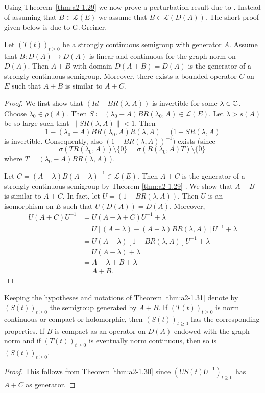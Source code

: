 Using Theorem~\ref{thm:a2-1.29}   we now prove a perturbation result due to \citet{deschschappacher:1984}.
Instead of assuming that $B \in \mathcal{L}(E)$ we assume that $B \in \mathcal{L}(D(A))$.
The short proof given below is due to G.\,Greiner.
\begin{theorem}\label{thm:a2-1.31}
Let $(T(t))_{t \geq 0}$ be a strongly continuous semigroup with generator $A$.
Assume that $B \colon D(A) \to D(A)$ is linear and continuous for the graph norm on $D(A)$.
Then $A + B$ with domain $D(A + B) = D(A)$ is the generator of a strongly continuous semigroup.
Moreover, there exists a bounded operator $C$ on $E$ such that $A + B$ is similar to $A + C$.
\end{theorem}
\begin{proof}
We first show that $(Id - BR(\lambda,A))$ is invertible for some $\lambda \in \mathbb{C}$.
Choose $\lambda_{0} \in \rho(A)$.
Then $S \coloneqq (\lambda_{0}-A)BR(\lambda_{0},A) \in \mathcal{L}(E)$.
Let $\lambda > s(A)$ be so large such that $\|SR(\lambda,A)\| < 1$.
Then 
\[
1 - (\lambda_{0} - A)BR(\lambda_{0},A)R(\lambda,A) = (1 - SR(\lambda,A)
\]
is invertible.
Consequently, also $(1 -BR(\lambda,A))^{-1})$ exists
(since 
\[
\sigma(TR(\lambda_{0},A)) \setminus \{0\} 
= \sigma(R(\lambda_{0},A)T) \setminus \{0\}\,
\]
where  $T = (\lambda_{0}-A)BR(\lambda,A)\, $).

Let $C = (A-\lambda)B(A-\lambda)^{-1} \in \mathcal{L}(E)$.
Then $A + C$ is the generator of a strongly continuous semigroup by Theorem \ref{thm:a2-1.29} . 
We show that $A + B$ is similar to $A + C$.
In fact, let $U = (1 - BR(\lambda,A))$.
Then $U$ is an isomorphism on $E$ such that $U(D(A)) = D(A)$. Moreover,
\begin{align*}		
U(A+C)U^{-1} &= U(A - \lambda+C)U^{-1} + \lambda \\
&= U[(A - \lambda) - (A-\lambda)BR(\lambda,A)]U^{-1} + \lambda \\
&= U(A - \lambda)[1 - BR(\lambda,A)]U^{-1} + \lambda \\
&= U(A - \lambda) + \lambda \\
&= A - \lambda + B + \lambda \\
&= A + B.	
\end{align*}
\end{proof}
\begin{corollary}\label{cor:a2-1.32}
Keeping the hypotheses and notations of Theorem \ref{thm:a2-1.31}   denote by \\ $(S(t))_{t\geq 0}$ the semigroup generated by $A+B$.
If $(T(t))_{t\geq 0}$ is norm continuous or compact or holomorphic, then $(S(t))_{t\geq 0}$ has the corresponding properties.
If $B$ is compact as an operator on $D(A)$ endowed with the graph norm and if $(T(t))_{t\geq 0}$ is eventually norm continuous, then so is $(S(t))_{t\geq 0}$.
\end{corollary}
\begin{proof}
This follows from Theorem \ref{thm:a2-1.30}   since 
$(US(t)U^{-1})_{t\geq 0}$ has $A+C$ as generator.
\end{proof}
